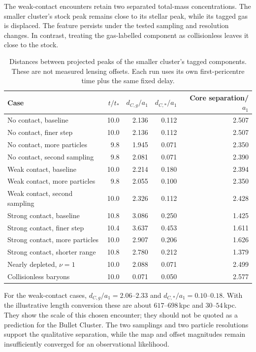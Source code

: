 \documentclass[11pt]{article}
\begin{document}
The weak-contact encounters retain two separated total-mass concentrations.
The smaller cluster's stock peak remains close to its stellar peak, while
its tagged gas is displaced. The feature persists under the tested sampling
and resolution changes. In contrast, treating the gas-labelled component as
collisionless leaves it close to the stock.

\begin{table}[ht]
\centering\small
\begin{tabular}{@{}lrrrr@{}}
\toprule
Case & $t/t_*$ & $d_{C,g}/a_1$ & $d_{C,*}/a_1$ & Core separation/$a_1$\\
\midrule
No contact, baseline & 10.0 & 2.136 & 0.112 & 2.507\\
No contact, finer step & 10.0 & 2.136 & 0.112 & 2.507\\
No contact, more particles & 9.8 & 1.945 & 0.071 & 2.350\\
No contact, second sampling & 9.8 & 2.081 & 0.071 & 2.390\\
Weak contact, baseline & 10.0 & 2.214 & 0.180 & 2.394\\
Weak contact, more particles & 9.8 & 2.055 & 0.100 & 2.350\\
Weak contact, second sampling & 10.0 & 2.326 & 0.112 & 2.428\\
Strong contact, baseline & 10.8 & 3.086 & 0.250 & 1.425\\
Strong contact, finer step & 10.4 & 3.637 & 0.453 & 1.611\\
Strong contact, more particles & 10.0 & 2.907 & 0.206 & 1.626\\
Strong contact, shorter range & 10.8 & 2.780 & 0.212 & 1.379\\
Nearly depleted, $\nu=1$ & 10.0 & 2.088 & 0.071 & 2.499\\
Collisionless baryons & 10.0 & 0.071 & 0.050 & 2.577\\
\bottomrule
\end{tabular}
\caption{Distances between projected peaks of the smaller cluster's tagged
components. These are not measured lensing offsets. Each run uses its own
first-pericentre time plus the same fixed delay.}
\end{table}

For the weak-contact cases, $d_{C,g}/a_1=2.06$--$2.33$ and
$d_{C,*}/a_1=0.10$--$0.18$. With the illustrative length conversion these
are about $617$--$698\,$kpc and $30$--$54\,$kpc. They show the scale of
this chosen encounter; they should not be quoted as a prediction for the
Bullet Cluster. The two samplings and two particle resolutions support the
qualitative separation, while the map and offset magnitudes remain insufficiently
converged for an observational likelihood.
\end{document}
